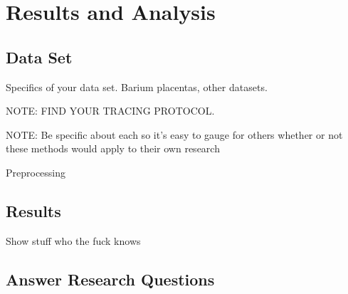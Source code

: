 
\chapter{Results and Analysis}

\section{Data Set}
Specifics of your data set. Barium placentas, other datasets.

NOTE: FIND YOUR TRACING PROTOCOL.

NOTE: Be specific about each so it's easy to gauge for others whether or not these methods would apply to their own research


Preprocessing



\section{Results}

Show stuff who the fuck knows

\section{Answer Research Questions}